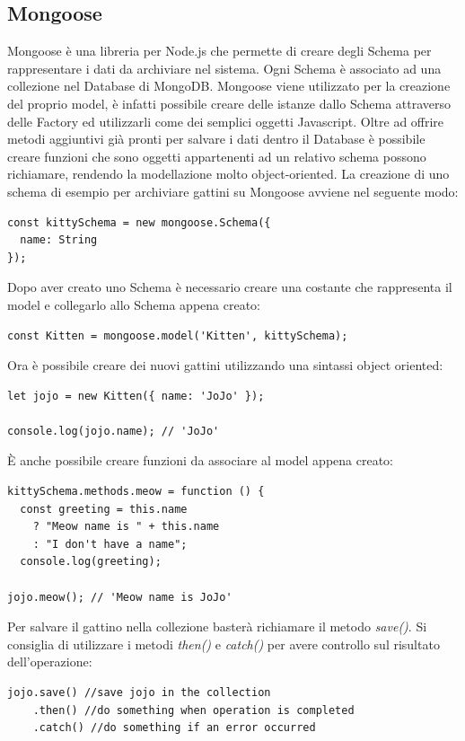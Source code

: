 \subsection{Mongoose}
Mongoose è una libreria per Node.js che permette di creare degli Schema per rappresentare i dati da archiviare nel sistema.\newline
Ogni Schema è associato ad una collezione nel Database di MongoDB.\newline
Mongoose viene utilizzato per la creazione del proprio model, è infatti possibile creare delle istanze dallo Schema attraverso delle Factory ed utilizzarli come dei semplici oggetti Javascript.\newline
Oltre ad offrire metodi aggiuntivi già pronti per salvare i dati dentro il Database è possibile creare funzioni che sono oggetti appartenenti ad un relativo schema possono richiamare, rendendo la modellazione molto object-oriented.\newline
La creazione di uno schema di esempio per archiviare gattini su Mongoose avviene nel seguente modo:
\begin{verbatim}
const kittySchema = new mongoose.Schema({
  name: String
});
\end{verbatim}
Dopo aver creato uno Schema è necessario creare una costante che rappresenta il model e collegarlo allo Schema appena creato:
\begin{verbatim}
const Kitten = mongoose.model('Kitten', kittySchema);
\end{verbatim}
Ora è possibile creare dei nuovi gattini utilizzando una sintassi object oriented:
\begin{verbatim}
let jojo = new Kitten({ name: 'JoJo' });

console.log(jojo.name); // 'JoJo'
\end{verbatim}
È anche possibile creare funzioni da associare al model appena creato:
\begin{verbatim}
kittySchema.methods.meow = function () {
  const greeting = this.name
    ? "Meow name is " + this.name
    : "I don't have a name";
  console.log(greeting);

jojo.meow(); // 'Meow name is JoJo'
\end{verbatim}
Per salvare il gattino nella collezione basterà richiamare il metodo \textit{save()}. Si consiglia di utilizzare i metodi \textit{then()} e \textit{catch()} per avere controllo sul risultato dell'operazione:
\begin{verbatim}
jojo.save() //save jojo in the collection
    .then() //do something when operation is completed
    .catch() //do something if an error occurred

\end{verbatim}

